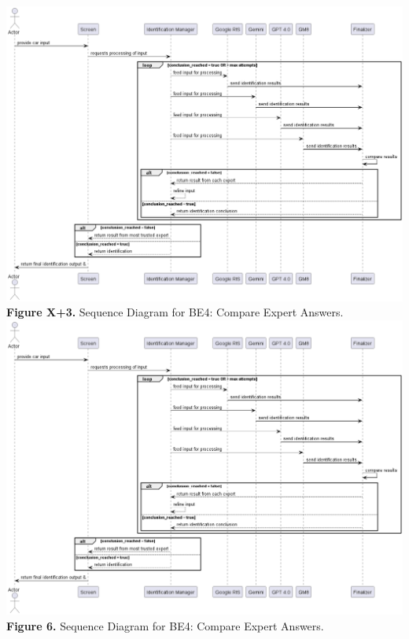\documentclass[]{article}
\begin{document}
\begin{center}
	\includegraphics[scale=0.4]{Sequence Diagrams/BE4_Sequence_Diagram.png}\\
	\textbf{Figure X+3.} Sequence Diagram for BE4: Compare Expert Answers.\\
	\includegraphics[scale=0.4]{Sequence Diagrams/BE4_Sequence_Diagram.png}\\
	\textbf{Figure 6.} Sequence Diagram for BE4: Compare Expert Answers.\\


\end{center}
\end{document}
